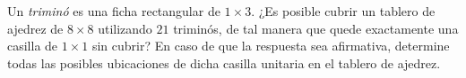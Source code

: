 Un \textit{triminó} es una ficha rectangular de $1\times 3$. ¿Es posible cubrir un tablero de ajedrez de $8 \times 8$ utilizando $21$ triminós, de tal manera que quede exactamente una casilla de $1 \times 1$ sin cubrir? En caso de que la respuesta sea afirmativa, determine todas las posibles ubicaciones de dicha casilla unitaria en el tablero de ajedrez.
